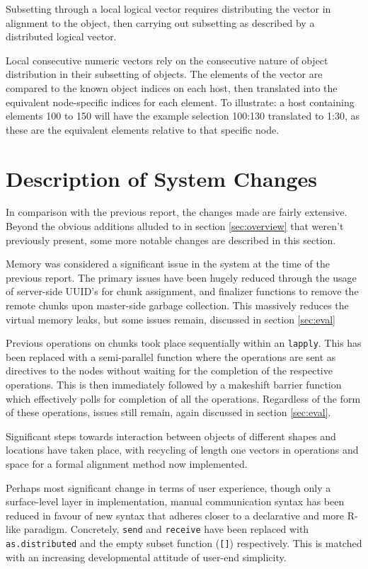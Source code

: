 \documentclass[a4paper,10pt]{article}
\begin{document}
Subsetting through a local logical vector requires distributing the vector in
alignment to the object, then carrying out subsetting as described by a
distributed logical vector.

Local consecutive numeric vectors rely on the consecutive nature of object
distribution in their subsetting of objects.  The elements of the vector are
compared to the known object indices on each host, then translated into the
equivalent node-specific indices for each element.  To illustrate: a host
containing elements 100 to 150 will have the example selection 100:130
translated to 1:30, as these are the equivalent elements relative to that
specific node.

\section{Description of System Changes}

In comparison with the previous report, the changes made are fairly extensive.
Beyond the obvious additions alluded to in section \ref{sec:overview} that
weren't previously present, some more notable changes are described in this
section.

Memory was considered a significant issue in the system at the time of the
previous report.  The primary issues have been hugely reduced through the usage
of server-side UUID's for chunk assignment, and finalizer functions to remove
the remote chunks upon master-side garbage collection.  This massively reduces
the virtual memory leaks, but some issues remain, discussed in section
\ref{sec:eval}

Previous operations on chunks took place sequentially within an
\texttt{lapply}.  This has been replaced with a semi-parallel function where
the operations are sent as directives to the nodes without waiting for the
completion of the respective operations.  This is then immediately followed by
a makeshift barrier function which effectively polls for completion of all the
operations.  Regardless of the form of these operations, issues still remain,
again discussed in section \ref{sec:eval}.

Significant steps towards interaction between objects of different shapes and
locations have taken place, with recycling of length one vectors in operations
and space for a formal alignment method now implemented.

Perhaps most significant change in terms of user experience, though only a
surface-level layer in implementation, manual communication syntax has been
reduced in favour of new syntax that adheres closer to a declarative and
more R-like paradigm.
Concretely, \texttt{send} and \texttt{receive} have been replaced with
\texttt{as.distributed} and the empty subset function (\texttt{[]})
respectively.
This is matched with an increasing developmental attitude of user-end
simplicity.
\end{document}
